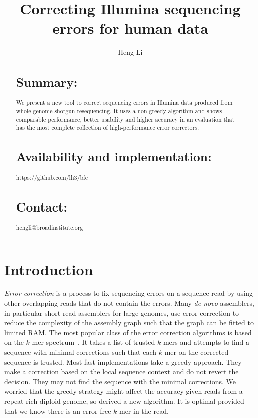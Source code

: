 \documentclass{bioinfo}
\begin{document}

\title[Error Correction for Illumina Data]{Correcting Illumina sequencing errors for human data}

\author[Li]{Heng Li}

\address{Broad Institute, 75 Ames Street, Cambridge, MA 02142, USA}

\maketitle

\begin{abstract}
\section{Summary:} We present a new tool to correct sequencing errors in
Illumina data produced from whole-genome shotgun resequencing. It uses a
non-greedy algorithm and shows comparable performance, better usability and
higher accuracy in an evaluation that has the most complete collection of
high-performance error correctors.

\section{Availability and implementation:} https://github.com/lh3/bfc

\section{Contact:} hengli@broadinstitute.org
\end{abstract}

\section{Introduction}

\emph{Error correction} is a process to fix sequencing errors on a sequence read
by using other overlapping reads that do not contain the errors. Many \emph{de
novo} assemblers, in particular short-read assemblers for large genomes, use
error correction to reduce the complexity of the assembly graph such that the
graph can be fitted to limited RAM. The most popular class of the error
correction algorithms is based on the $k$-mer spectrum~\citep{Pevzner:2001vn}.
It takes a list of trusted $k$-mers and attempts to find a sequence with
minimal corrections such that each $k$-mer on the corrected sequence is
trusted. Most fast implementations take a greedy approach. They make a
correction based on the local sequence context and do not revert the decision.
They may not find the sequence with the minimal corrections. We worried that
the greedy strategy might affect the accuracy given reads from a repeat-rich
diploid genome, so derived a new algorithm. It is optimal provided that we know
there is an error-free $k$-mer in the read.
\end{document}
